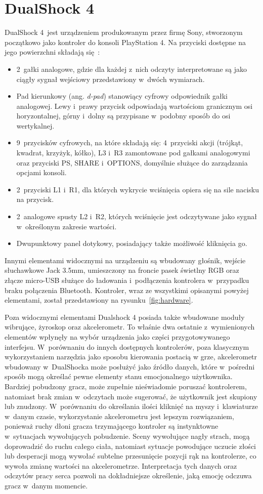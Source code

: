 \section{DualShock 4}
DualShock 4~jest urządzeniem produkowanym przez firmę Sony, stworzonym początkowo jako kontroler do konsoli PlayStation 4. Na przyciski dostępne na jego powierzchni składają się~\cite{dualshock_specification}:
\begin{itemize}
	\item 2~gałki analogowe, gdzie dla każdej z~nich odczyty interpretowane są jako ciągły sygnał wejściowy przedstawiony w~dwóch wymiarach.
	\item Pad kierunkowy (ang. \textit{d-pad}) stanowiący cyfrowy odpowiednik gałki analogowej. Lewy i~prawy przycisk odpowiadają wartościom granicznym osi horyzontalnej, górny i~dolny są przypisane w~podobny sposób do osi wertykalnej.
	\item 9~przycisków cyfrowych, na które składają się: 4~przyciski akcji (trójkąt, kwadrat, krzyżyk, kółko), L3 i~R3 zamontowane pod gałkami analogowymi oraz przyciski PS, SHARE i~OPTIONS, domyślnie służące do zarządzania opcjami konsoli.
	\item 2~przyciski L1 i~R1, dla których wykrycie wciśnięcia opiera się na sile nacisku na przycisk.
	\item 2~analogowe spusty L2 i~R2, których wciśnięcie jest odczytywane jako sygnał w~określonym zakresie wartości.
	\item Dwupunktowy panel dotykowy, posiadający także możliwość kliknięcia go.
\end{itemize}
Innymi elementami widocznymi na urządzeniu są wbudowany głośnik, wejście słuchawkowe Jack 3.5mm, umieszczony na froncie pasek świetlny RGB oraz złącze micro-USB służące do ładowania i~podłączenia kontrolera w~przypadku braku połączenia Bluetooth. Kontroler, wraz ze wszystkimi opisanymi powyżej elementami, został przedstawiony na rysunku~\ref{fig:hardware}.

Poza widocznymi elementami Dualshock 4 posiada także wbudowane moduły wibrujące, żyroskop oraz akcelerometr. To właśnie dwa ostatnie z~wymienionych elementów wpłynęły na wybór urządzenia jako części przygotowywanego interfejsu. W~porównaniu do innych dostępnych kontrolerów, poza klasycznym wykorzystaniem narzędzia jako sposobu kierowania postacią w grze, akcelerometr wbudowany w~DualShocka może posłużyć jako źródło danych, które w~pośredni sposób mogą określać pewne elementy stanu emocjonalnego użytkownika. Bardziej pobudzony gracz, może zupełnie nieświadomie poruszać kontrolerem, natomiast brak zmian w~odczytach może sugerować, że użytkownik jest skupiony lub znudzony. W~porównaniu do określania ilości kliknięć na myszy i~klawiaturze w~danym czasie, wykorzystanie akcelerometru jest lepszym rozwiązaniem, ponieważ ruchy dłoni gracza trzymającego kontroler są instynktowne w~sytuacjach wywołujących pobudzenie. Sceny wywołujące nagły strach, mogą doprowadzić do ruchu całego ciała, natomiast sytuacje powodujące uczucie złości lub desperacji mogą wywołać subtelne przesunięcie pozycji rąk na kontrolerze, co wywoła zmianę wartości na akcelerometrze. Interpretacja tych danych oraz odczytów pracy serca pozwoli na dokładniejsze określenie, jaką emocję odczuwa gracz w~danym momencie.


